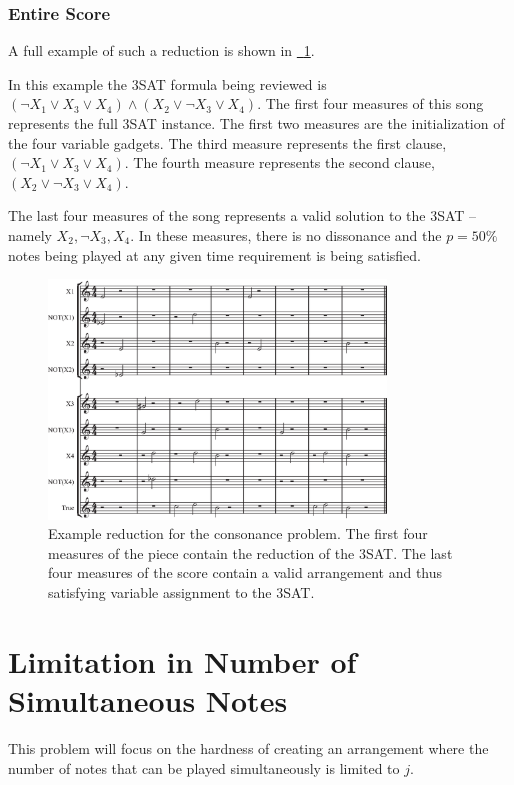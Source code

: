 \documentclass[11pt,letterpaper]{article}
\newcommand{\figref}[2][{}]{\hyperref[#2]{\figurename~\ref{#2}#1}}
\begin{document}
\subsubsection{Entire Score}
A full example of such a reduction is shown in \figref{fullscore}.

In this example the 3SAT formula being reviewed is $(\neg X_1 \vee X_3 \vee X_4) \wedge (X_2 \vee \neg X_3 \vee X_4)$. The first four measures of this song represents the full 3SAT instance. The first two measures are the initialization of the four variable gadgets. The third measure represents the first clause, $(\neg X_1 \vee X_3 \vee X_4)$. The fourth measure represents the second clause, $(X_2 \vee \neg X_3 \vee X_4)$.

The last four measures of the song represents a valid solution to the 3SAT -- namely $X_2,\neg X_3,X_4$. In these measures, there is no dissonance and the $p=50\%$ notes being played at any given time requirement is being satisfied.


\begin{figure}[h!]
  \centering
    \includegraphics[width=0.8\textwidth]{score.eps}
  \caption{Example reduction for the consonance problem. The first four measures of the piece contain the reduction of the 3SAT. The last four measures of the score contain a valid arrangement and thus satisfying variable assignment to the 3SAT. }
  \label{fullscore}
\end{figure}

\newpage

\section{Limitation in Number of Simultaneous Notes}
This problem will focus on the hardness of creating an arrangement where the number of notes that can be played simultaneously is limited to $j$.
\end{document}
